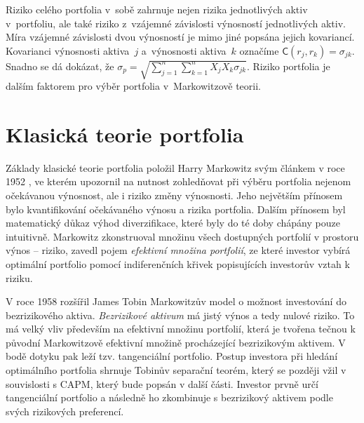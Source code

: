 \documentclass[a4paper,12pt]{report}
\theoremstyle{definition} \newtheorem{definice}[veta]{Definice}
\theoremstyle{remark}
\begin{document}
Riziko celého portfolia v~sobě zahrnuje nejen rizika jednotlivých aktiv v~portfoliu, ale také riziko z~vzájemné závislosti výnosností jednotlivých aktiv.
Míra vzájemné závislosti dvou výnosností je mimo jiné popsána jejich kovariancí. 
Kovarianci výnosnosti aktiva~$j$ a~výnosnosti aktiva~$k$ označíme $\mathsf{C}(r_j,r_k)=\sigma_{jk}$.
Snadno se dá dokázat, že $\sigma_p=\sqrt{\sum_{j=1}^n\sum_{k=1}^nX_jX_k\sigma_{jk}}$.
Riziko portfolia je dalším faktorem pro výběr portfolia v~Markowitzově teorii.  




\section{Klasická teorie portfolia}\label{KTP}

Základy klasické teorie portfolia položil Harry Markowitz svým článkem v roce 1952 \cite{markowitz}, ve kterém upozornil na nutnost zohledňovat při výběru portfolia nejenom očekávanou výnosnost, ale i riziko změny výnosnosti.
Jeho největším přínosem bylo kvantifikování očekávaného výnosu a rizika portfolia. 
Dalším přínosem byl matematický důkaz výhod diverzifikace, které byly do té doby chápány pouze intuitivně.
Markowitz zkonstruoval množinu všech dostupných portfolií v prostoru výnos -- riziko, zavedl pojem \textit{efektivní množina portfolií}, ze které investor vybírá optimální portfolio pomocí indiferenčních křivek popisujících investorův vztah k riziku.

V roce 1958 rozšířil James Tobin \cite{tobin} Markowitzův model o možnost investování do bezrizikového aktiva.
\textit{Bezrizikové aktivum} má jistý výnos a tedy nulové riziko.
To má velký vliv především na efektivní množinu portfolií, která je tvořena tečnou k původní Markowitzově efektivní množině procházející bezrizikovým aktivem.
V bodě dotyku pak leží tzv. tangenciální portfolio.
Postup investora při hledání optimálního portfolia shrnuje Tobinův separační teorém, který se později vžil v souvislosti s CAPM, který bude popsán v další části.%
Investor prvně určí tangenciální portfolio a následně ho zkombinuje s bezrizikový aktivem podle svých rizikových preferencí.
\end{document}
